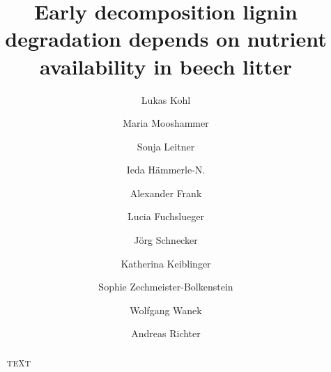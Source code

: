 \documentclass[journal abbreviation]{copernicus}
\begin{document}
\title{Early decomposition lignin degradation depends on nutrient availability in beech litter}


\author[1]{Lukas Kohl}
\author[1]{Maria Mooshammer}
\author[1]{Sonja Leitner}
\author[1]{Ieda H\"ammerle-N.}
\author[1]{Alexander Frank}
\author[1]{Lucia Fuchslueger}
\author[1]{J\"org Schnecker}
\author[2]{Katherina Keiblinger}
\author[2]{Sophie Zechmeister-Bolkenstein}
\author[1]{Wolfgang Wanek}
\author[1]{Andreas Richter}









 


\received{}
\pubdiscuss{} %
\revised{}
\accepted{}
\published{}



\maketitle



\begin{abstract}
TEXT
\end{abstract}



\introduction











\end{document}
